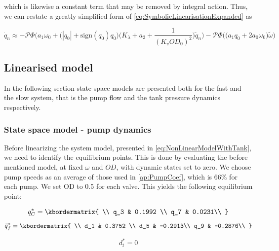 which is likewise a constant term that may be removed by integral action. Thus, we can restate a greatly simplified form of \cref{eq:SymbolicLinearisationExpanded} as

\begin{equation}\label{eq:SymbolicLinearisationSimplified}
	\dot{q}_n \approx -\mathcal{P}\Phi\Bigg(a_1\omega_0 + \Big(|q_0|+\text{sign}(q_0)q_0\Big)\Bigg(K_\lambda + a_2 + \frac{1}{(K_v OD_0)^2}\Bigg) \tilde{q}_n \Bigg) -  \mathcal{P}\Phi\Bigg(\Big(a_1 q_0 + 2a_0\omega_0\Big) \tilde{\omega}\Bigg)
\end{equation}

\clearpage

\subsection{Linearised model}
In the following section state space models are presented both for the fast and the slow system, that is the pump flow and the tank pressure dynamics respectively. 

\subsubsection{State space model - pump dynamics}
Before linearizing the system model, presented in \cref{eq:NonLinearModelWithTank}, we need to identify the equilibrium points. This is done by evaluating the before mentioned model, at fixed $ \omega $ and $ OD $, with dynamic states set to zero. We choose pump speeds as an average of those used in \cref{ap:PumpCoef}, which is $ 66\% $ for each pump. We set OD to $ 0.5 $ for each valve. This yields the following equilibrium point:

	\begin{equation}
	q_C^* = \kbordermatrix{
		\\
		q_3 & 0.1992 \\ 
		q_7 & 0.0231\\
	}
\end{equation}
	\begin{equation}
	\bar{q}_f^* = \kbordermatrix{
		\\
		d_1 & 0.3752 \\ 
		d_5 & -0.2913\\
		q_9 & -0.2876\\
	}
	\end{equation}

\begin{equation}
	d_t^* = 0
\end{equation}


